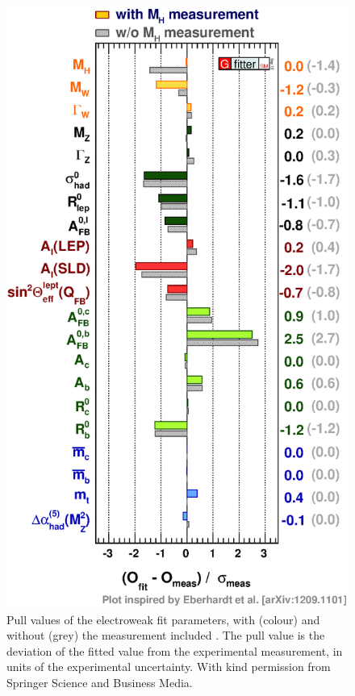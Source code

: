 \begin{figure}[p]
	\includegraphics[width=\mediumfigwidth]{tex/conclusions/ewfit_pulls}
	\caption{Pull values of the electroweak fit parameters, with (colour) and without 
	(grey) the \mH measurement included \cite{Gfitter:2013}. The pull value is the 
	deviation of the fitted value from the experimental measurement, in units of the 
	experimental uncertainty.
	With kind permission from Springer Science and Business Media.}
	\label{fig:concl:ewfit_pulls}
\end{figure}



